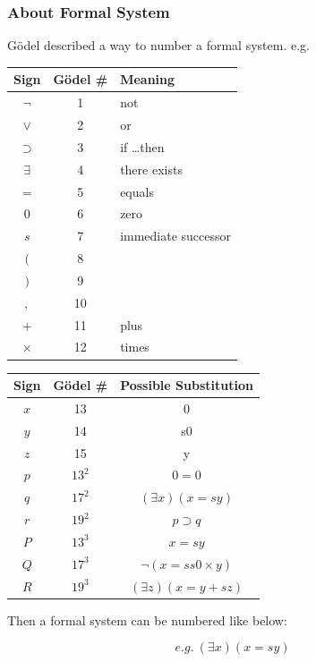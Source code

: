 \documentclass[a4paper, openany]{book}
\begin{document}
\subsubsection{About Formal System}

Gödel described a way to number a formal system. e.g.

\hspace*{\fill}

\begin{tabular}{ccl}
  Sign & Gödel \# & Meaning \\
  \hline
  $\neg$ & 1 & not \\
  $\lor$ & 2 & or \\
  $\supset$ & 3 & if \dots then \\
  $\exists$ & 4 & there exists \\
  $=$ & 5 & equals \\
  $0$ & 6 & zero \\
  $s$ & 7 & immediate successor \\
  $($ & 8 & \\
  $)$ & 9 & \\
  $,$ & 10 & \\
  $+$ & 11 & plus \\
  $\times$ & 12 & times \\
\end{tabular}
\qquad
\begin{tabular}{ccc}
  Sign & Gödel \# & Possible Substitution \\
  \hline
  $x$ & 13 & 0 \\
  $y$ & 14 & s0 \\
  $z$ & 15 & y \\
  $p$ & $13^2$ & $0 = 0$ \\
  $q$ & $17^2$ & $( \exists x ) ( x = sy )$ \\
  $r$ & $19^2$ & $p \supset q$ \\
  $P$ & $13^3$ & $x = sy$ \\
  $Q$ & $17^3$ & $\neg ( x = ss0 \times y )$ \\
  $R$ & $19^3$ & $( \exists z ) ( x = y + sz )$
\end{tabular}

\hspace*{\fill}

\hspace*{\fill}

Then a formal system can be numbered like below:

$$e.g. \  ( \exists x ) ( x = sy )$$
\end{document}
